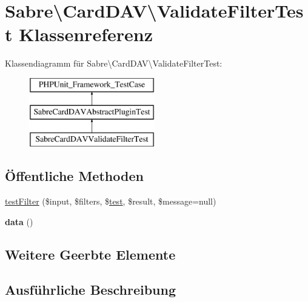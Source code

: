 \hypertarget{class_sabre_1_1_card_d_a_v_1_1_validate_filter_test}{}\section{Sabre\textbackslash{}Card\+D\+AV\textbackslash{}Validate\+Filter\+Test Klassenreferenz}
\label{class_sabre_1_1_card_d_a_v_1_1_validate_filter_test}
Klassendiagramm für Sabre\textbackslash{}Card\+D\+AV\textbackslash{}Validate\+Filter\+Test\+:\begin{figure}[H]
\begin{center}
\leavevmode
\includegraphics[height=3.000000cm]{class_sabre_1_1_card_d_a_v_1_1_validate_filter_test}
\end{center}
\end{figure}
\subsection*{Öffentliche Methoden}
\begin{DoxyCompactItemize}
\item 
\mbox{\hyperlink{class_sabre_1_1_card_d_a_v_1_1_validate_filter_test_a9993826f4fff51ffcdd9c3e68e2b6f8a}{test\+Filter}} (\$input, \$filters, \$\mbox{\hyperlink{classtest}{test}}, \$result, \$message=null)
\item 
\mbox{\label{class_sabre_1_1_card_d_a_v_1_1_validate_filter_test_a17b882c1a477796233ce4102f783e480}} 
{\bfseries data} ()
\end{DoxyCompactItemize}
\subsection*{Weitere Geerbte Elemente}


\subsection{Ausführliche Beschreibung}



